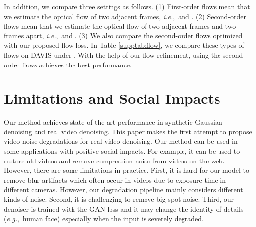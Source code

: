 \documentclass[10pt,twocolumn,letterpaper]{article}
\def\ie{\mbox{\textit{i.e.}, }}
\def\eg{\mbox{\textit{e.g.}, }}
\newlength \g
\begin{document}
In addition, we compare three settings as follows.
(1) First-order flows mean that we estimate the optical flow of two adjacent frames, \ie  and .
(2) Second-order flows mean that we estimate the optical flow of two adjacent frames and two frames apart, \ie  and .
(3) We also compare the second-order flows optimized with our proposed flow loss.
In Table \ref{supptab:flow}, we compare these types of flows on DAVIS under .
With the help of our flow refinement, using the second-order flows achieves the best performance.



\section{Limitations and Social Impacts} \label{suppsec:limit}
Our method achieves state-of-the-art performance in synthetic Gaussian denoising and real video denoising. 
This paper makes the first attempt to propose video noise degradations for real video denoising.
Our method can be used in some applications with positive social impacts.
For example, it can be used to restore old videos and remove compression noise from videos on the web.
However, there are some limitations in practice. 
First, it is hard for our model to remove blur artifacts which often occur in videos due to exposure time in different cameras.
However, our degradation pipeline mainly considers different kinds of noise. 
Second, it is challenging to remove big spot noise.
Third, our denoiser is trained with the GAN loss and it may change the identity of details (\eg human face) especially when the input is severely degraded.
\end{document}
